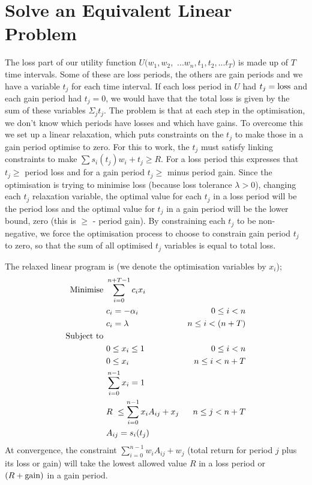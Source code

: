 \documentclass[12pt]{article}
\begin{document}
\section{Solve an Equivalent Linear Problem}
The loss part of our utility function $U(w_1,w_2,$ $...w_n,t_1,t_2,...t_T)$ is made up of $T$ time intervals. Some of these
are loss periods, the others are gain periods and we have a variable $t_j$ for each time interval. If each loss period in $U$ had $t_j = {\rm loss}$ and each gain period had
$t_j=0$, we would have that the total loss is given by the sum of these variables $\Sigma_j t_j$. The problem is that at each step in the optimisation,
we don't know which periods have losses and which have gains. To overcome this we set up a linear relaxation, which puts constraints on the $t_j$ to make those in a gain period optimise to zero.
For this to work, the $t_j$ must satisfy
linking constraints to make $\sum s_i( t_j )w_i +t_j \ge R$. For a loss period this expresses that $t_j \ge$ period loss and for a gain period
$t_j \ge$ minus period gain. Since the optimisation is trying to minimise loss (because loss tolerance $\lambda > 0$), changing each $t_j$ relaxation variable, the optimal value 
for each $t_j$ in a loss period will be the period loss and the optimal value for $t_j$ in a gain period will be the lower bound, zero (this is $\ge$ - period gain).
By constraining each $t_j$ to be non-negative, we force the optimisation process to choose to constrain gain period 
$t_j$ to zero, so that the sum of all optimised $t_j$ variables is equal to total loss.

The relaxed linear program is (we denote the optimisation variables by $x_i$);
\begin{align*}
    {\rm Minimise}\ & \sum_{i=0}^{n+T-1} c_i x_i\cr
    &c_i=-\alpha_i &0\le i < n\cr
    &c_i =\lambda &n\le i < (n+T)\cr
    {\rm Subject\ to}\ &\cr& 0 \le x_i \le 1\ &0\le i < n\cr
    & 0 \le x_i \ &n\le i < n+T\cr
    & \sum_{i=0}^{n-1} x_i = 1\cr
    & R\ \le\sum_{i=0}^{n-1} x_i A_{ij} + x_j  &n\le j < n+T\cr
    & A_{ij} = s_i(t_j )\cr
\end{align*}
At convergence, the constraint $\sum_{i=0}^{n-1} w_i A_{ij} + w_j$ (total return for period $j$ plus its loss or gain) will take the lowest allowed value $R$ in a loss period or $(R+{\rm gain})$ in a gain period.
\end{document}
